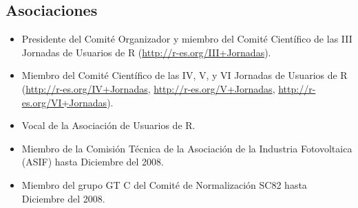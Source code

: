 \documentclass[article, a4paper]{memoir}
\begin{document}
\subsection{Asociaciones}
\label{sec:orgheadline86}

\begin{itemize}
\item Presidente del Comité Organizador y miembro del Comité Científico de las III Jornadas de Usuarios de R (\url{http://r-es.org/III+Jornadas}).

\item Miembro del Comité Científico de las IV, V, y VI Jornadas de Usuarios de R (\url{http://r-es.org/IV+Jornadas}, \url{http://r-es.org/V+Jornadas}, \url{http://r-es.org/VI+Jornadas}).

\item Vocal de la Asociación de Usuarios de R.

\item Miembro de la Comisión Técnica de la Asociación de la Industria Fotovoltaica (ASIF) hasta Diciembre del 2008.

\item Miembro del grupo GT C del Comité de Normalización SC82 hasta Diciembre del 2008.
\end{itemize}
\end{document}
